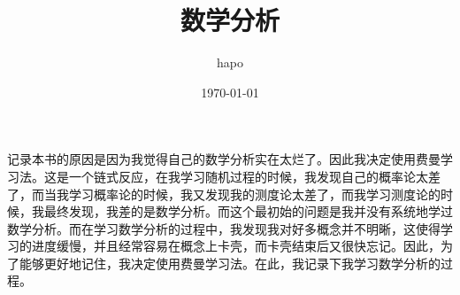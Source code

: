 \documentclass[lang=cn]{elegantbook}
\title{数学分析}
\author{hapo}
\date{\today}
\begin{document}
\maketitle
\frontmatter

\tableofcontents

\mainmatter
记录本书的原因是因为我觉得自己的数学分析实在太烂了。因此我决定使用费曼学习法。这是一个链式反应，在我学习随机过程的时候，我发现自己的概率论太差了，而当我学习概率论的时候，我又发现我的测度论太差了，而我学习测度论的时候，我最终发现，我差的是数学分析。而这个最初始的问题是我并没有系统地学过数学分析。而在学习数学分析的过程中，我发现我对好多概念并不明晰，这使得学习的进度缓慢，并且经常容易在概念上卡壳，而卡壳结束后又很快忘记。因此，为了能够更好地记住，我决定使用费曼学习法。在此，我记录下我学习数学分析的过程。







\end{document}
